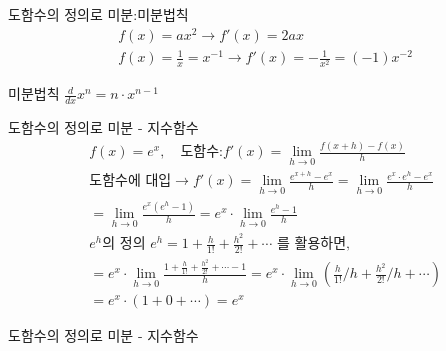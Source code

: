 \documentclass[aspectratio=169]{beamer}
\begin{document}
\begin{frame}{도함수의 정의로 미분:미분법칙}
  \begin{align*}
    & f(x) = ax^2 \rightarrow f'(x) = 2ax \\
    & f(x) = \frac{1}{x} = x^{-1} \rightarrow  f'(x) = -\frac{1}{x^2} = ({-1})x^{-2}
  \end{align*}
  \vspace{10pt}
  \begin{MyTheorem}{미분법칙}{}
    \phantom{.}\( \frac{d}{dx} x^n = n \cdot x^{n-1} \)\phantom{.}
  \end{MyTheorem}
\end{frame}



\begin{frame}{도함수의 정의로 미분 - 지수함수}
  \begin{align*}
    & f(x) = e^x, \quad \text{도함수:} f'(x) = \lim_{h \to 0} \frac{f(x+h)-f(x)}{h} \\
    & \text{도함수에 대입} \rightarrow f'(x) = \lim_{h \to 0} \frac{e^{x+h} - e^x}{h} = \lim_{h \to 0} \frac{e^x \cdot e^h - e^x}{h} \\
    & = \lim_{h \to 0} \frac{e^x (e^h - 1)}{h} = e^x \cdot \lim_{h \to 0} \frac{e^h - 1}{h} \\
    & e^h \text{의 정의 } e^h = 1 + \frac{h}{1!} + \frac{h^2}{2!} + \cdots \text{ 를 활용하면,}\\
    & = e^x \cdot \lim_{h \to 0} \frac{1 + \frac{h}{1!} + \frac{h^2}{2!} + \cdots - 1}{h}  = e^x \cdot \lim_{h \to 0} (\frac{h}{1!}/h + \frac{h^2}{2!}/h + \cdots) \\
    & = e^x \cdot (1 + 0 + \cdots) = e^x    
  \end{align*}
\end{frame}


\begin{frame}{도함수의 정의로 미분 - 지수함수}
\end{frame}
\end{document}
